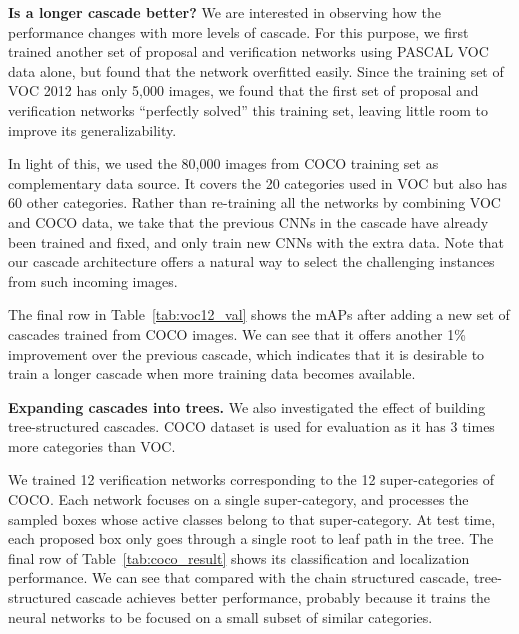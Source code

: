 \documentclass[10pt,twocolumn,letterpaper]{article}
\begin{document}
\textbf{Is a longer cascade better?} We are interested in observing how the performance changes with more levels of cascade. For this purpose, we first trained another set of proposal and verification networks using PASCAL VOC data alone, but found that the network overfitted easily. Since the training set of VOC 2012 has only 5,000 images, we found that the first set of proposal and verification networks ``perfectly solved'' this training set, leaving little room to improve its generalizability.

In light of this, we used the 80,000 images from COCO training set as complementary data source. It covers the 20 categories used in VOC but also has 60 other categories. Rather than re-training all the networks by combining VOC and COCO data, we take that the previous CNNs in the cascade have already been trained and fixed, and only train new CNNs with the extra data. Note that our cascade architecture offers a natural way to select the challenging instances from such incoming images.

The final row in Table~\ref{tab:voc12_val} shows the mAPs after adding a new set of cascades trained from COCO images. We can see that it offers another 1\% improvement over the previous cascade, which indicates that it is desirable to train a longer cascade when more training data becomes available.


\textbf{Expanding cascades into trees.} We also investigated the effect of building tree-structured cascades. COCO dataset is used for evaluation as it has 3 times more categories than VOC. 

We trained 12 verification networks corresponding to the 12 super-categories of COCO. Each network focuses on a single super-category, and processes the sampled boxes whose active classes belong to that super-category. At test time, each proposed box only goes through a single root to leaf path in the tree. The final row of Table~\ref{tab:coco_result} shows its classification and localization performance. We can see that compared with the chain structured cascade, tree-structured cascade achieves better performance, probably because it trains the neural networks to be focused on a small subset of similar categories.
\end{document}
